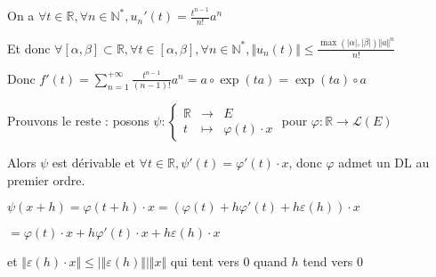\documentclass[a4paper,12pt]{book}
\def\R{\mathbb{R}}
\def\N{\mathbb{N}}
\begin{document}
{\par On a $\forall t\in\R, \forall n\in\N^*, u_n'(t) =\frac{t^{n-1}}{n!}a^n$
\par Et donc $\forall [\alpha,\beta]\subset \R,\forall t\in[\alpha,\beta], \forall n\in\N^*, \Vert u_n(t)\Vert \leq \frac{\max(\vert \alpha\vert,\vert\beta\vert)\Vert a\Vert^n}{n!}$ 
\par Donc $f'(t) = \sum\limits_{n=1}^{+\infty}\frac{t^{n-1}}{(n-1)!}a^n=a\circ\exp(ta)=\exp(ta)\circ a$
\par Prouvons le reste : posons $\psi:\left\{\begin{array}{rcl} \R & \to & E \\ t &\mapsto & \varphi(t)\cdot x\end{array}\right.$ pour $\varphi:\R\to\mathcal{L}(E)$
\par Alors $\psi$ est dérivable et $\forall t\in\R, \psi'(t) = \varphi'(t)\cdot x$, donc $\varphi$ admet un DL au premier ordre.
\par $\psi(x+h) = \varphi(t+h)\cdot x = (\varphi(t)+h\varphi'(t)+h\varepsilon(h))\cdot x$
\par $ = \varphi(t)\cdot x + h\varphi'(t)\cdot x + h\varepsilon(h)\cdot x$
\par et $\Vert \varepsilon(h)\cdot x\Vert \leq \vert\Vert\varepsilon(h)\Vert\vert\Vert x\Vert$ qui tent vers 0 quand $h$ tend vers $0$}
\end{document}
